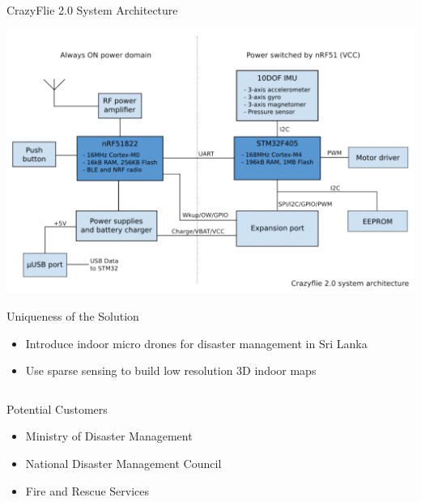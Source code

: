\documentclass[xcolor=table]{beamer}
\begin{document}
\begin{frame}{CrazyFlie 2.0 System Architecture}
  \begin{center}
  \includegraphics[scale=0.3]{Crazy_Archi.png}
  \end{center}
\end{frame}

\begin{frame}{Uniqueness of the Solution}
  \begin{itemize}
  \item Introduce indoor micro drones for disaster management in Sri Lanka
  \item Use sparse sensing to build low resolution 3D indoor maps
  \end{itemize}

  \begin{columns}
  \begin{block}{Potential Customers} 
  \begin{itemize}
  \item Ministry of Disaster Management
  \item National Disaster Management Council
  \item Fire and Rescue Services
  \end{itemize}
  \end{block}
  \end{columns} 
\end{frame}
\end{document}
